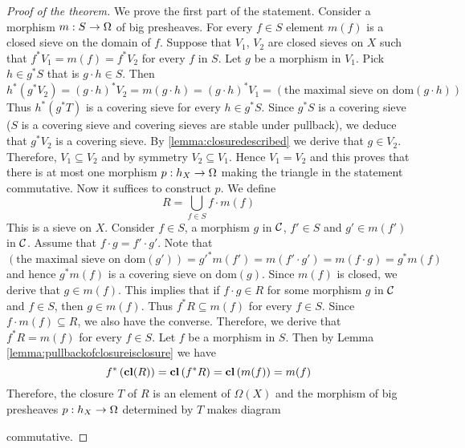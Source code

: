 \begin{proof}[Proof of the theorem]
We prove the first part of the statement. Consider a morphism $m:S\rightarrow \Omega$ of big presheaves. For every $f\in S$ element $m(f)$ is a closed sieve on the domain of $f$. Suppose that $V_1$, $V_2$ are closed sieves on $X$ such that $f^*V_1 = m(f) = f^*V_2$ for every $f$ in $S$. Let $g$ be a morphism in $V_1$. Pick $h\in g^*S$ that is $g\cdot h\in S$. Then
$$h^*\left(g^*V_2\right) = (g\cdot h)^*V_2 = m(g\cdot h) = (g\cdot h)^*V_1 = \left(\mbox{the maximal sieve on }\mathrm{dom}(g\cdot h)\right)$$
Thus $h^*\left(g^*T\right)$ is a covering sieve for every $h\in g^*S$. Since $g^*S$ is a covering sieve ($S$ is a covering sieve and covering sieves are stable under pullback), we deduce that $g^*V_2$ is a covering sieve. By \ref{lemma:closuredescribed} we derive that $g\in V_2$. Therefore, $V_1\subseteq V_2$ and by symmetry $V_2\subseteq V_1$. Hence $V_1 = V_2$ and this proves that there is at most one morphism $p:h_X\rightarrow \Omega$ making the triangle in the statement commutative. Now it suffices to construct $p$. We define
$$R = \bigcup_{f\in S}f\cdot m(f)$$
This is a  sieve on $X$. Consider $f \in S$, a morphism $g$ in ${\mathcal C}$, $f'\in S$ and $g'\in m(f')$ in ${\mathcal C}$. Assume that $f\cdot g = f'\cdot g'$. Note that
$$\left(\mbox{the maximal sieve on }\mathrm{dom}(g')\right) = g'^*m(f') = m(f'\cdot g') = m(f\cdot g) = g^*m(f) $$
and hence $g^*m(f)$ is a covering sieve on $\mathrm{dom}(g)$. Since $m(f)$ is closed, we derive that $g\in m(f)$. This implies that if $f\cdot g \in R$ for some morphism $g$ in ${\mathcal C}$ and $f\in S$, then $g\in m(f)$. Thus $f^*R\subseteq m(f)$ for every $f\in S$. Since $f\cdot m(f)\subseteq R$, we also have the converse. Therefore, we derive that $f^*R = m(f)$ for every $f\in S$. Let $f$ be a morphism in $S$. Then by Lemma \ref{lemma:pullbackofclosureisclosure} we have
$$f^*\left(\mathbf{cl}(R)\right) = \mathbf{cl}\left(f^*R\right) = \mathbf{cl}\left(m(f)\right) = m(f)$$
Therefore, the closure $T$ of $R$ is an element of $\Omega(X)$ and the morphism of big presheaves $p:h_X\rightarrow \Omega$ determined by $T$ makes diagram
\begin{center}
\end{center}
commutative.
\end{proof}

